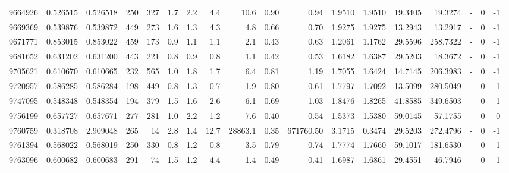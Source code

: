 \begin{tabular}{rrrrrrrrrrrrrrrlrr}
   9664926 & 0.526515 &   0.526518 &  250 &  327 &      1.7 &      2.2 &     4.4 &     10.6 &       0.90 &        0.94 &  1.9510 &  1.9510 &   19.3405 &   19.3274 &             - &        0 &         -1 \\
   9669369 & 0.539876 &   0.539872 &  449 &  273 &      1.6 &      1.3 &     4.3 &      4.8 &       0.66 &        0.70 &  1.9275 &  1.9275 &   13.2943 &   13.2917 &             - &        0 &         -1 \\
   9671771 & 0.853015 &   0.853022 &  459 &  173 &      0.9 &      1.1 &     1.1 &      2.1 &       0.43 &        0.63 &  1.2061 &  1.1762 &   29.5596 &  258.7322 &             - &        0 &         -1 \\
   9681652 & 0.631202 &   0.631200 &  443 &  221 &      0.8 &      0.9 &     0.8 &      1.1 &       0.42 &        0.53 &  1.6182 &  1.6387 &   29.5203 &   18.3672 &             - &        0 &         -1 \\
   9705621 & 0.610670 &   0.610665 &  232 &  565 &      1.0 &      1.8 &     1.7 &      6.4 &       0.81 &        1.19 &  1.7055 &  1.6424 &   14.7145 &  206.3983 &             - &        0 &         -1 \\
   9720957 & 0.586285 &   0.586284 &  198 &  449 &      0.8 &      1.3 &     0.7 &      1.9 &       0.80 &        0.61 &  1.7797 &  1.7092 &   13.5099 &  280.5049 &             - &        0 &         -1 \\
   9747095 & 0.548348 &   0.548354 &  194 &  379 &      1.5 &      1.6 &     2.6 &      6.1 &       0.69 &        1.03 &  1.8476 &  1.8265 &   41.8585 &  349.6503 &             - &        0 &         -1 \\
   9756199 & 0.657727 &   0.657671 &  277 &  281 &      1.0 &      2.2 &     1.2 &      7.6 &       0.40 &        0.54 &  1.5373 &  1.5380 &   59.0145 &   57.1755 &             - &        0 &          0 \\
   9760759 & 0.318708 &   2.909048 &  265 &   14 &      2.8 &      1.4 &    12.7 &  28863.1 &       0.35 &   671760.50 &  3.1715 &  0.3474 &   29.5203 &  272.4796 &             - &        0 &         -1 \\
   9761394 & 0.568022 &   0.568019 &  250 &  330 &      0.8 &      1.2 &     0.8 &      3.5 &       0.79 &        0.74 &  1.7774 &  1.7660 &   59.1017 &  181.6530 &             - &        0 &         -1 \\
   9763096 & 0.600682 &   0.600683 &  291 &   74 &      1.5 &      1.2 &     4.4 &      1.4 &       0.49 &        0.41 &  1.6987 &  1.6861 &   29.4551 &   46.7946 &             - &        0 &         -1 \\

\end{tabular}

